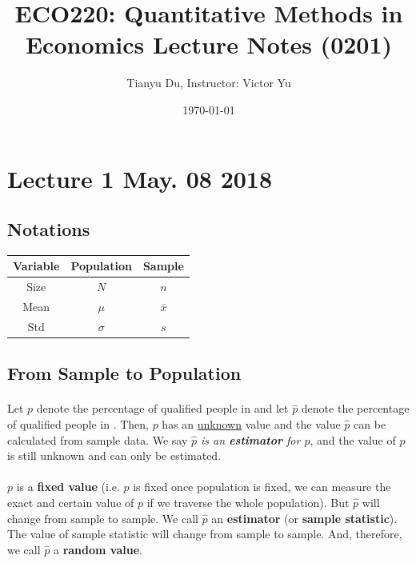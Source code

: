 \documentclass{article}
\title{ECO220: Quantitative Methods in Economics \newline Lecture Notes (0201)}
\author{Tianyu Du, Instructor: Victor Yu}
\date{\today}
\begin{document}
	\maketitle
	\tableofcontents
	
	\section{Lecture 1 May. 08 2018}
	\subsection{Notations}
			\begin{center}
			\begin{tabular}{|c|c|c|}
				\hline
				Variable & Population & Sample \\
				\hline
				Size & $N$ & $n$ \\
				\hline
				Mean & $\mu$ & $\overline{x}$ \\
				\hline
				Std & $\sigma$ & $s$ \\
				\hline
			\end{tabular}
		\end{center}
	
	\subsection{From Sample to Population}
	\paragraph{} Let $p$ denote the percentage of qualified people in  and let $\hat{p}$ denote the percentage of qualified people in . Then, $p$ has an \underline{unknown} value and the value $\hat{p}$ can be calculated from sample data. We say \emph{$\hat{p}$ is an \textbf{estimator} for $p$}, and the value of $p$ is still unknown and can only be estimated.
	\paragraph{}$p$ is a \textbf{fixed value} (i.e. $p$ is fixed once population is fixed, we can measure the exact and certain value of $p$ if we traverse the whole population). But $\hat{p}$ will change from sample to sample. We call $\hat{p}$ an \textbf{estimator} (or \textbf{sample statistic}). The value of sample statistic will change from sample to sample. And, therefore, we call $\hat{p}$ a \textbf{random value}.
	
\end{document}
